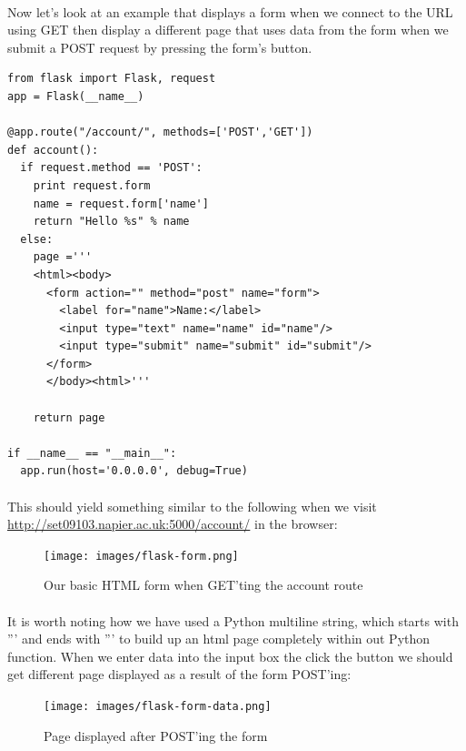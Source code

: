 \documentclass[12pt, a4paper, oneside]{book}
\begin{document}
\paragraph{} Now let's look at an example that displays a form when we connect to the URL using GET then display a different page that uses data from the form when we submit a POST request by pressing the form's button.

\begin{lstlisting}
from flask import Flask, request
app = Flask(__name__)

@app.route("/account/", methods=['POST','GET'])
def account():
  if request.method == 'POST':
    print request.form
    name = request.form['name']
    return "Hello %s" % name
  else:
    page ='''
    <html><body>
      <form action="" method="post" name="form">
        <label for="name">Name:</label>
        <input type="text" name="name" id="name"/>
        <input type="submit" name="submit" id="submit"/>
      </form>
      </body><html>'''

    return page
    
if __name__ == "__main__":
  app.run(host='0.0.0.0', debug=True)
\end{lstlisting}

\paragraph{} This should yield something similar to the following when we visit \url{http://set09103.napier.ac.uk:5000/account/} in the browser:

\begin{figure}[H]
\centering
\texttt{[image: images/flask-form.png]}
\caption{Our basic HTML form when GET'ting the account route}
\label{fig:flask-form}
\end{figure}

\paragraph{} It is worth noting how we have used a Python multiline string, which starts with ''' and ends with ''' to build up an html page completely within out Python function. When we enter data into the input box the click the button we should get different page displayed as a result of the form POST'ing:

\begin{figure}[H]
\centering
\texttt{[image: images/flask-form-data.png]}
\caption{Page displayed after POST'ing the form}
\label{fig:flask-form-data}
\end{figure}
\end{document}
